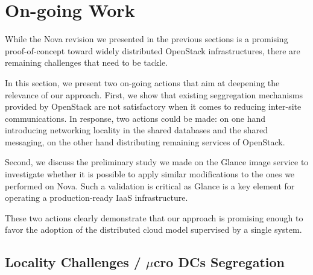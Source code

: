 \section{On-going Work}
\label{sec:ongoing_work}

While the Nova revision we presented in the previous
sections is a promising proof-of-concept toward widely distributed OpenStack
infrastructures, there are remaining challenges that need to be tackle.


In  this section,  we present  two on-going  actions that  aim at  deepening the
relevance of our approach. First,  we show that existing seggregation mechanisms
provided by OpenStack are not satisfactory  when it comes to reducing inter-site
communications.
In  response,  two actions  could be  made:  on one  hand
introducing  networking  locality  in  the   shared  databases  and  the  shared
messaging, on the other hand distributing remaining services of OpenStack.


Second, we discuss the preliminary study we  made on the Glance image service to
investigate whether it is possible to apply similar modifications to the ones we
performed on Nova. Such a validation is  critical as Glance is a key element for
operating a production-ready IaaS infrastructure.

These two actions clearly demonstrate that our approach is promising
enough to favor the adoption of the distributed cloud model supervised by a
single system.

\subsection{Locality Challenges / $\mu$cro DCs Segregation}


